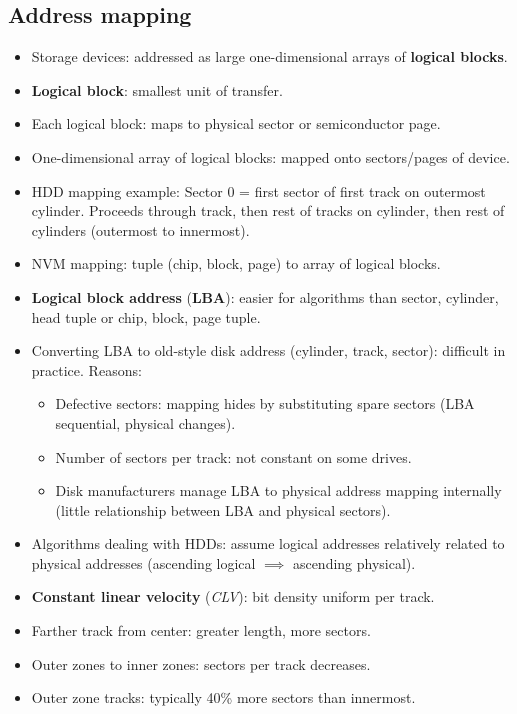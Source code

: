 \subsection{Address mapping}
\begin{itemize}
    \item Storage devices: addressed as large one-dimensional arrays of \textbf{logical blocks}.
    \item \textbf{Logical block}: smallest unit of transfer.
    \item Each logical block: maps to physical sector or semiconductor page.
    \item One-dimensional array of logical blocks: mapped onto sectors/pages of device.
    \item HDD mapping example: Sector 0 = first sector of first track on outermost cylinder. Proceeds through track, then rest of tracks on cylinder, then rest of cylinders (outermost to innermost).
    \item NVM mapping: tuple (chip, block, page) to array of logical blocks.
    \item \textbf{Logical block address} (\textbf{LBA}): easier for algorithms than sector, cylinder, head tuple or chip, block, page tuple.
    \item Converting LBA to old-style disk address (cylinder, track, sector): difficult in practice. Reasons:
    \begin{itemize}
        \item Defective sectors: mapping hides by substituting spare sectors (LBA sequential, physical changes).
        \item Number of sectors per track: not constant on some drives.
        \item Disk manufacturers manage LBA to physical address mapping internally (little relationship between LBA and physical sectors).
    \end{itemize}
    \item Algorithms dealing with HDDs: assume logical addresses relatively related to physical addresses (ascending logical $\implies$ ascending physical).
    \item \textbf{Constant linear velocity} (\textit{CLV}): bit density uniform per track.
    \item Farther track from center: greater length, more sectors.
    \item Outer zones to inner zones: sectors per track decreases.
    \item Outer zone tracks: typically 40\% more sectors than innermost.

\end{itemize}
